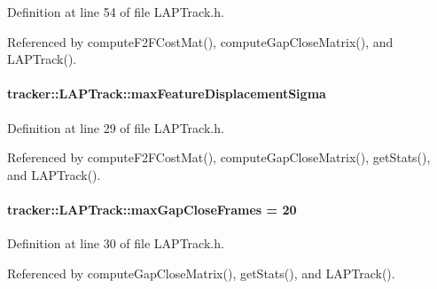 Definition at line 54 of file L\+A\+P\+Track.\+h.



Referenced by compute\+F2\+F\+Cost\+Mat(), compute\+Gap\+Close\+Matrix(), and L\+A\+P\+Track().

\paragraph[{\texorpdfstring{max\+Feature\+Displacement\+Sigma}{maxFeatureDisplacementSigma}}]{ tracker\+::\+L\+A\+P\+Track\+::max\+Feature\+Displacement\+Sigma}\hypertarget{classtracker_1_1LAPTrack_a220f2d5a80b5999ed3c70e31a04901b0}{}\label{classtracker_1_1LAPTrack_a220f2d5a80b5999ed3c70e31a04901b0}


Definition at line 29 of file L\+A\+P\+Track.\+h.



Referenced by compute\+F2\+F\+Cost\+Mat(), compute\+Gap\+Close\+Matrix(), get\+Stats(), and L\+A\+P\+Track().

\paragraph[{\texorpdfstring{max\+Gap\+Close\+Frames}{maxGapCloseFrames}}]{ tracker\+::\+L\+A\+P\+Track\+::max\+Gap\+Close\+Frames = 20}\hypertarget{classtracker_1_1LAPTrack_a3b70051e6eb22f9798c865109740ab48}{}\label{classtracker_1_1LAPTrack_a3b70051e6eb22f9798c865109740ab48}


Definition at line 30 of file L\+A\+P\+Track.\+h.



Referenced by compute\+Gap\+Close\+Matrix(), get\+Stats(), and L\+A\+P\+Track().

